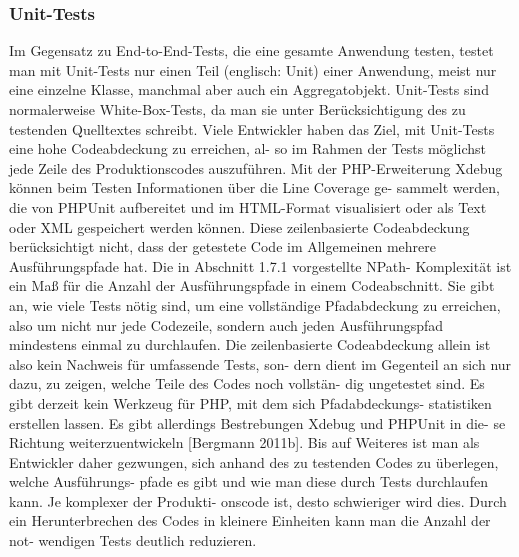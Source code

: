 \subsubsection{Unit-Tests}
Im Gegensatz zu End-to-End-Tests, die eine gesamte Anwendung testen, testet man mit
Unit-Tests nur einen Teil (englisch: Unit) einer Anwendung, meist nur eine einzelne Klasse,
manchmal aber auch ein Aggregatobjekt. Unit-Tests sind normalerweise White-Box-Tests,
da man sie unter Berücksichtigung des zu testenden Quelltextes schreibt.
Viele Entwickler haben das Ziel, mit Unit-Tests eine hohe Codeabdeckung zu erreichen, al-
so im Rahmen der Tests möglichst jede Zeile des Produktionscodes auszuführen. Mit der
PHP-Erweiterung Xdebug können beim Testen Informationen über die Line Coverage ge-
sammelt werden, die von PHPUnit aufbereitet und im HTML-Format visualisiert oder als
Text oder XML gespeichert werden können.
Diese zeilenbasierte Codeabdeckung berücksichtigt nicht, dass der getestete Code im
Allgemeinen mehrere Ausführungspfade hat. Die in Abschnitt 1.7.1 vorgestellte NPath-
Komplexität ist ein Maß für die Anzahl der Ausführungspfade in einem Codeabschnitt. Sie
gibt an, wie viele Tests nötig sind, um eine vollständige Pfadabdeckung zu erreichen, also
um nicht nur jede Codezeile, sondern auch jeden Ausführungspfad mindestens einmal zu
durchlaufen.
Die zeilenbasierte Codeabdeckung allein ist also kein Nachweis für umfassende Tests, son-
dern dient im Gegenteil an sich nur dazu, zu zeigen, welche Teile des Codes noch vollstän-
dig ungetestet sind. Es gibt derzeit kein Werkzeug für PHP, mit dem sich Pfadabdeckungs-
statistiken erstellen lassen. Es gibt allerdings Bestrebungen Xdebug und PHPUnit in die-
se Richtung weiterzuentwickeln [Bergmann 2011b]. Bis auf Weiteres ist man als Entwickler
daher gezwungen, sich anhand des zu testenden Codes zu überlegen, welche Ausführungs-
pfade es gibt und wie man diese durch Tests durchlaufen kann. Je komplexer der Produkti-
onscode ist, desto schwieriger wird dies.
Durch ein Herunterbrechen des Codes in kleinere Einheiten kann man die Anzahl der not-
wendigen Tests deutlich reduzieren.

